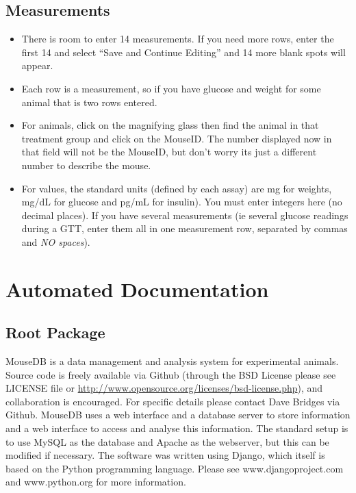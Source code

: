 \documentclass[letterpaper,10pt,english]{sphinxmanual}
\begin{document}
\section{Measurements}
\label{usage:measurements}\begin{itemize}
\item {} 
There is room to enter 14 measurements.  If you need more rows, enter the first 14 and select ``Save and Continue Editing'' and 14 more blank spots will appear.

\item {} 
Each row is a measurement, so if you have glucose and weight for some animal that is two rows entered.

\item {} 
For animals, click on the magnifying glass then find the animal in that treatment group and click on the MouseID. The number displayed now in that field will not be the MouseID, but don't worry its just a different number to describe the mouse.

\item {} 
For values, the standard units (defined by each assay) are mg for weights, mg/dL for glucose and pg/mL for insulin).  You must enter integers here (no decimal places).  If you have several measurements (ie several glucose readings during a GTT, enter them all in one measurement row, separated by commas and \emph{NO spaces}).

\end{itemize}


\chapter{Automated Documentation}
\label{api:automated-documentation}\label{api::doc}

\section{Root Package}
\label{api:root-package}\label{api:module-mousedb}
MouseDB is a data management and analysis system for experimental animals.  Source code is freely available via Github (through the BSD License please see LICENSE file or \href{http://www.opensource.org/licenses/bsd-license.php}{http://www.opensource.org/licenses/bsd-license.php}), and collaboration is encouraged.  For specific details please contact Dave Bridges via Github.  MouseDB uses a web interface and a database server to store information and a web interface to access and analyse this information.  The standard setup is to use MySQL as the database and Apache as the webserver, but this can be modified if necessary.  The software was written using Django, which itself is based on the Python programming language.  Please see www.djangoproject.com and www.python.org for more information.
\end{document}
